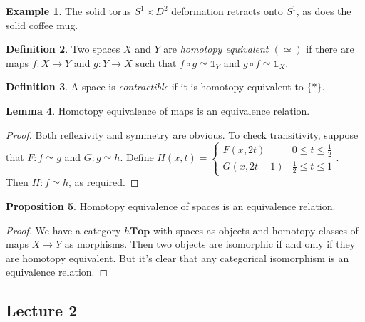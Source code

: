 \documentclass[10pt,letterpaper,cm]{nupset}
\theoremstyle{definition}
\newtheorem{definition}{Definition}[subsection]
\newtheorem{exmp}[definition]{Example}
\theoremstyle{theorem}
\newtheorem{lemma}[definition]{Lemma}
\newtheorem{prop}[definition]{Proposition}
\theoremstyle{remark}
\newcommand{\1}{\mathbb{1}}
\newcommand{\0}{\vec 0}
\begin{document}
\begin{exmp}
The solid torus $S^1 \times D^2$ deformation retracts onto $S^1$, as does the solid coffee mug.
\end{exmp}

\begin{definition}
Two spaces $X$ and $Y$ are \textit{homotopy equivalent $(\simeq)$} if there are maps $f: X\to Y$ and $g: Y \to X$ such that $f\circ g \simeq \mathbb{1}_Y$ and $g\circ f \simeq \mathbb{1}_X$.
\end{definition}

\begin{definition}
A space is \textit{contractible} if it is homotopy equivalent to $\{\ast \}$.
\end{definition}

\begin{lemma}
Homotopy equivalence of maps is an equivalence relation.
\end{lemma}
\begin{proof}
Both reflexivity and symmetry are obvious. To check transitivity, suppose that $F : f \simeq g$ and $G: g\simeq h$. Define $H(x,t) = \begin{cases}
F(x, 2t) & 0 \leq t \leq \frac{1}{2}
\\ G(x, 2t-1) & \frac{1}{2} \leq t \leq 1
\end{cases}.$ Then $H : f \simeq h$, as required. 
\end{proof}

\begin{prop}
Homotopy equivalence of spaces is an equivalence relation.
\end{prop}
\begin{proof}
We have a category $h\mathbf{Top}$ with spaces as objects and homotopy classes of maps $X \to Y$ as morphisms. Then two objects are isomorphic if and only if they are homotopy equivalent. But it's clear that any categorical isomorphism is an equivalence relation.  
\end{proof}

\subsection{Lecture 2}
\end{document}
